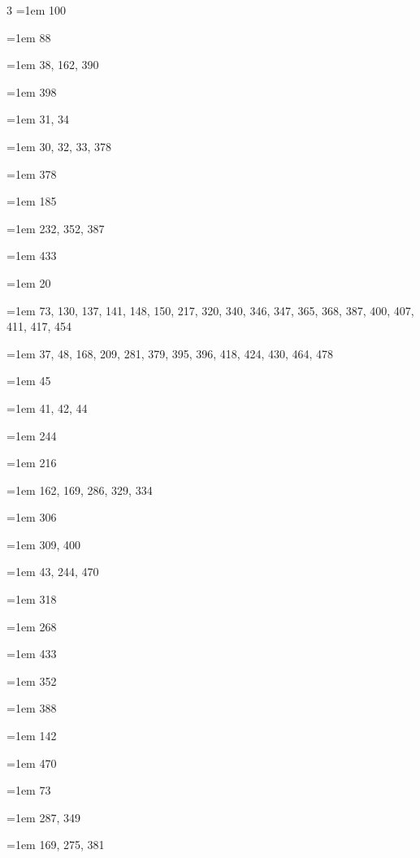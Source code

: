 \begin{multicols}{3}
\hangindent=1em  100\par
\hangindent=1em  88\par
\hangindent=1em  38, 162, 390\par
\hangindent=1em  398\par
\hangindent=1em  31, 34\par
\hangindent=1em  30, 32, 33, 378\par
\hangindent=1em  378\par
\hangindent=1em  185\par
\hangindent=1em  232, 352, 387\par
\hangindent=1em  433\par
\hangindent=1em  20\par
\hangindent=1em  73, 130, 137, 141, 148, 150, 217, 320, 340, 346, 347, 365, 368, 387, 400, 407, 411, 417, 454\par
\hangindent=1em  37, 48, 168, 209, 281, 379, 395, 396, 418, 424, 430, 464, 478\par
\hangindent=1em  45\par
\hangindent=1em  41, 42, 44\par
\hangindent=1em  244\par
\hangindent=1em  216\par
\hangindent=1em  162, 169, 286, 329, 334\par
\hangindent=1em  306\par
\hangindent=1em  309, 400\par
\hangindent=1em  43, 244, 470\par
\hangindent=1em  318\par
\hangindent=1em  268\par
\hangindent=1em  433\par
\hangindent=1em  352\par
\hangindent=1em  388\par
\hangindent=1em  142\par
\hangindent=1em  470\par
\hangindent=1em  73\par
\hangindent=1em  287, 349\par
\hangindent=1em  169, 275, 381\par

\end{multicols}
